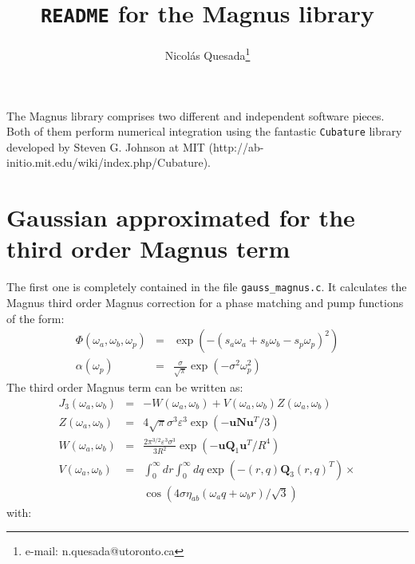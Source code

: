 \documentclass[10pt,letterpaper]{article}
\title{\texttt{README} for the Magnus library}
\author{Nicol\'as Quesada\footnote{e-mail: n.quesada@utoronto.ca}}
\begin{document}
\maketitle



The Magnus library comprises two different and independent software pieces. Both of them perform numerical integration using the fantastic \verb|Cubature| library developed by Steven G. Johnson at MIT (http://ab-initio.mit.edu/wiki/index.php/Cubature).\\
\section{Gaussian approximated for the third order Magnus term}
The first one is completely contained in the file \verb|gauss_magnus.c|. It calculates the Magnus third order Magnus correction for a phase matching and pump functions of the form:
\begin{eqnarray}
\Phi(\omega_a,\omega_b,\omega_p)&=&\exp(-(s_a \omega_a+s_b \omega_b-s_p \omega_p)^2)\\
\alpha(\omega_p)&=&\frac{\sigma}{\sqrt{\pi}} \exp(-\sigma^2 \omega_p^2)
\end{eqnarray}
The third order Magnus term can be written as:
\begin{eqnarray}\label{J_3}
J_3(\omega_a,\omega_b)&=&-W(\omega_a,\omega_b)+V(\omega_a,\omega_b) Z(\omega_a,\omega_b)\\
Z(\omega_a,\omega_b)&=&4\sqrt{\pi} \sigma^3 \varepsilon^3 \exp\left(-\mathbf{u} \mathbf{N} \mathbf{u}^T/3\right)\\
W(\omega_a,\omega_b)&=&\frac{2\pi^{3/2} \varepsilon^3 \sigma^3}{3 R^2} \exp\left(-\mathbf{u}\mathbf{Q}_1\mathbf{u}^T/R^4 \right)\\
V(\omega_a,\omega_b)&=& \int_0^{\infty} dr \int_0^{\infty} dq \exp\left(-(r,q) \mathbf{Q}_3 (r,q)^T \right) \times \nonumber\\
&&\cos\left(4 \sigma \eta_{ab}( \omega_a q+ \omega_b r)/\sqrt{3}  \right)\nonumber
\end{eqnarray}
with:
\end{document}
